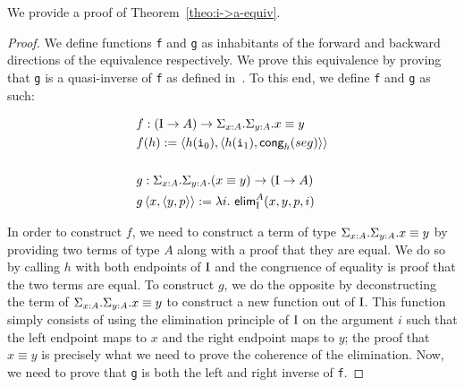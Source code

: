 \documentclass[12pt,twoside,maitrise]{dms}
\theoremstyle{definition}
\numberwithin{equation}{section}
\numberwithin{table}{chapter}
\numberwithin{figure}{chapter}
\newcommand\kw[1] {\textsf{#1}}
\newcommand\id[1] {\texttt{#1}}
\newcommand\fn[1] {\texttt{#1}}
\begin{document}
We provide a proof of Theorem~\ref{theo:i->a-equiv}.

\begin{proof}
We define functions \id{f} and \id{g} as inhabitants of the forward and backward
directions of the equivalence respectively. We prove this equivalence by proving
that \fn{g} is a quasi-inverse of \fn{f} as defined in~\cite[Chap.
  2]{HoTTbook}. To this end, we define \id{f} and \id{g} as such:

\begin{align*}
  & f : (\bI \rightarrow A) \rightarrow \Sigma_{\oftype{x}{A}} . \Sigma_{\oftype{y}{A}} . \eqtype{x}{y} \\
  & f(h) := \braket{h(\ileft), \braket{h(\iright), \kw{cong}_{h}(seg)}} \\ \\
  & g : \Sigma_{\oftype{x}{A}} . \Sigma_{\oftype{y}{A}} . (\eqtype{x}{y}) \rightarrow  (\bI \rightarrow A) \\
  & g \braket{x, \braket{y, p}} := \lambda i . \ \kw{elim}_{\bI}^{A}(x, y, p, i)
\end{align*}

In order to construct $f$, we need to construct a term of type
$\Sigma_{\oftype{x}{A}} . \Sigma_{\oftype{y}{A}} . \eqtype{x}{y}$ by providing
two terms of type $A$ along with a proof that they are equal. We do so by
calling $h$ with both endpoints of $\mathrm{I}$ and the congruence of equality is proof
that the two terms are equal. To construct $g$, we do the opposite by
deconstructing the term of $\Sigma_{\oftype{x}{A}} . \Sigma_{\oftype{y}{A}} .
\eqtype{x}{y}$ to construct a new function out of $\mathrm{I}$. This function simply
consists of using the elimination principle of $\mathrm{I}$ on the argument $i$ such
that the left endpoint maps to $x$ and the right endpoint maps to $y$; the proof
that $x \equiv y$ is precisely what we need to prove the coherence of the
elimination. Now, we need to prove that \id{g} is both the left and right
inverse of \id{f}.


\end{proof}
\end{document}
